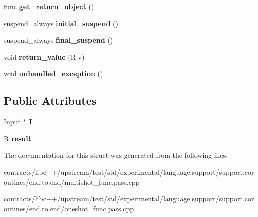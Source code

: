 \begin{DoxyCompactItemize}
\mbox{\hyperlink{structfunc}{func}} {\bfseries get\+\_\+return\+\_\+object} ()
\item 
\mbox{\label{structfunc_1_1promise__type_aa0d457a25e41acdf83c404ae0876d3d1}} 
suspend\+\_\+always {\bfseries initial\+\_\+suspend} ()
\item 
\mbox{\label{structfunc_1_1promise__type_abbb30c4fb5469bf620ec23c269af0ef4}} 
suspend\+\_\+always {\bfseries final\+\_\+suspend} ()
\item 
\mbox{\label{structfunc_1_1promise__type_a4cc42c36ed4fb5c54ef97f0f51fb6d92}} 
void {\bfseries return\+\_\+value} (R v)
\item 
\mbox{\label{structfunc_1_1promise__type_aef00667082cfe2a22df5f686f1017ab0}} 
void {\bfseries unhandled\+\_\+exception} ()
\end{DoxyCompactItemize}
\subsection*{Public Attributes}
\begin{DoxyCompactItemize}
\item 
\mbox{\label{structfunc_1_1promise__type_ae86a6c5e4d620cbd5b0ce2dc1a3a9465}} 
\mbox{\hyperlink{structfunc_1_1_input}{Input}} $\ast$ {\bfseries I}
\item 
\mbox{\label{structfunc_1_1promise__type_a8cceb2aad2c91e76f67b3c2b62e68acb}} 
R {\bfseries result}
\end{DoxyCompactItemize}


The documentation for this struct was generated from the following files\+:\begin{DoxyCompactItemize}
\item 
contracts/libc++/upstream/test/std/experimental/language.\+support/support.\+coroutines/end.\+to.\+end/multishot\+\_\+func.\+pass.\+cpp\item 
contracts/libc++/upstream/test/std/experimental/language.\+support/support.\+coroutines/end.\+to.\+end/oneshot\+\_\+func.\+pass.\+cpp\end{DoxyCompactItemize}
